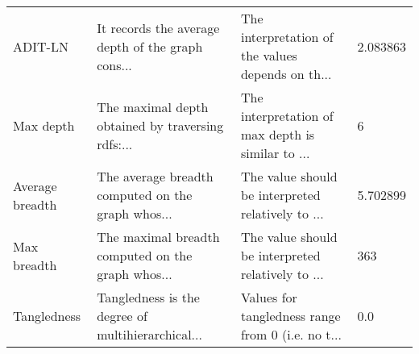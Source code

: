 \begin{tabular}{llll}
                 ADIT-LN &  It records the average depth of the graph cons... &  The interpretation of the values depends on th... &    2.083863 \\
               Max depth &  The maximal depth obtained by traversing rdfs:... &  The interpretation of max depth is similar to ... &           6 \\
         Average breadth &  The average breadth computed on the graph whos... &  The value should be interpreted relatively to ... &    5.702899 \\
             Max breadth &  The maximal breadth computed on the graph whos... &  The value should be interpreted relatively to ... &         363 \\
             Tangledness &  Tangledness is the degree of multihierarchical... &  Values for tangledness range from 0 (i.e. no t... &         0.0 \\
\bottomrule
\end{tabular}
